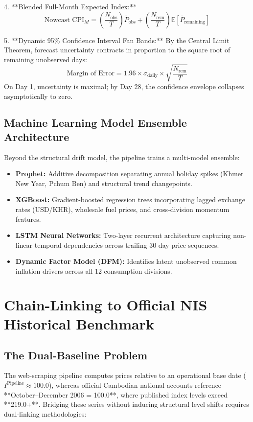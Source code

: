 \documentclass[11pt,a4paper]{article}
\begin{document}
4. **Blended Full-Month Expected Index:**
\begin{equation}
\text{Nowcast CPI}_M = \left( \frac{N_{\text{obs}}}{T} \right) \bar{P}_{\text{obs}} + \left( \frac{N_{\text{rem}}}{T} \right) \mathbb{E}[\bar{P}_{\text{remaining}}]
\end{equation}

5. **Dynamic 95\% Confidence Interval Fan Bands:**
By the Central Limit Theorem, forecast uncertainty contracts in proportion to the square root of remaining unobserved days:
\begin{equation}
\text{Margin of Error} = 1.96 \times \sigma_{\text{daily}} \times \sqrt{\frac{N_{\text{rem}}}{T}}
\end{equation}
On Day 1, uncertainty is maximal; by Day 28, the confidence envelope collapses asymptotically to zero.

\subsection{Machine Learning Model Ensemble Architecture}
Beyond the structural drift model, the pipeline trains a multi-model ensemble:
\begin{itemize}[noitemsep]
    \item \textbf{Prophet:} Additive decomposition separating annual holiday spikes (Khmer New Year, Pchum Ben) and structural trend changepoints.
    \item \textbf{XGBoost:} Gradient-boosted regression trees incorporating lagged exchange rates (USD/KHR), wholesale fuel prices, and cross-division momentum features.
    \item \textbf{LSTM Neural Networks:} Two-layer recurrent architecture capturing non-linear temporal dependencies across trailing 30-day price sequences.
    \item \textbf{Dynamic Factor Model (DFM):} Identifies latent unobserved common inflation drivers across all 12 consumption divisions.
\end{itemize}

\newpage

\section{Chain-Linking to Official NIS Historical Benchmark}

\subsection{The Dual-Baseline Problem}
The web-scraping pipeline computes prices relative to an operational base date ($I^{\text{Pipeline}} \approx 100.0$), whereas official Cambodian national accounts reference **October--December 2006 = 100.0**, where published index levels exceed **219.0+**. Bridging these series without inducing structural level shifts requires dual-linking methodologies:
\end{document}
